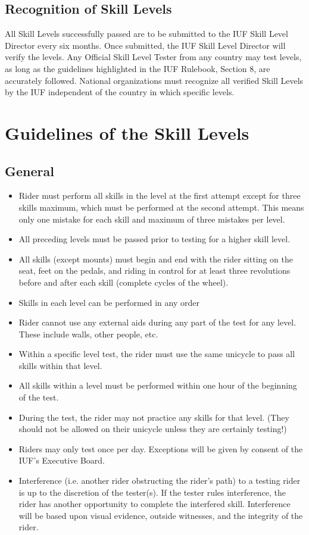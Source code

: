 \subsection{ Recognition of Skill Levels}
All Skill Levels successfully passed are to be submitted to the IUF Skill Level Director every six months. Once
submitted, the IUF Skill Level Director will verify the levels. Any Official Skill Level Tester from any country may
test levels, as long as the guidelines highlighted in the IUF Rulebook, Section 8, are accurately followed. National
organizations must recognize all verified Skill Levels by the IUF independent of the country in which specific levels.

\section{Guidelines of the Skill Levels}
\subsection{General}
\begin{itemize}
\item Rider must perform all skills in the level at the first attempt except for three skills maximum, which must be
performed at the second attempt. This means only one mistake for each skill and maximum of three mistakes per
level.
\item All preceding levels must be passed prior to testing for a higher skill level.
\item All skills (except mounts) must begin and end with the rider sitting on the seat, feet on the pedals, and riding in
control for at least three revolutions before and after each skill (complete cycles of the wheel).
\item Skills in each level can be performed in any order
\item Rider cannot use any external aids during any part of the test for any level. These include walls, other people, etc.
\item Within a specific level test, the rider must use the same unicycle to pass all skills within that level.
\item All skills within a level must be performed within one hour of the beginning of the test.
\item During the test, the rider may not practice any skills for that level. (They should not be allowed on their unicycle
unless they are certainly testing!)
\item Riders may only test once per day. Exceptions will be given by consent of the IUF's Executive Board.
\item Interference (i.e. another rider obstructing the rider's path) to a testing rider is up to the discretion of the tester(s). If the tester rules interference, the rider has another opportunity to complete the interfered skill. Interference will be
based upon visual evidence, outside witnesses, and the integrity of the rider.
\end{itemize}

